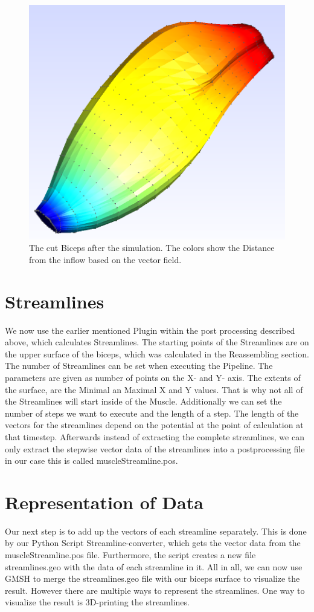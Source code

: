 \documentclass[preprint,journal]{vgtc}       %
\begin{document}
\begin{figure}
	\begin{center}
		\includegraphics[width=.7\linewidth]{Sim.png}
	\end{center}
	\caption{The cut Biceps after the simulation. The colors show the Distance from the inflow based on the vector field.}
	\label{fig:sim}
\end{figure}

\section{Streamlines}
We now use the earlier mentioned Plugin within the post processing described above, which calculates Streamlines. 
The starting points of the Streamlines are on the upper surface of the biceps, which was calculated in the Reassembling section. 
The number of Streamlines can be set when executing the Pipeline.
The parameters are given as number of points on the X- and Y- axis. 
The extents of the surface, are the Minimal an Maximal X and Y values. 
That is why not all of the Streamlines will start inside of the Muscle. 
Additionally we can set the number of steps we want to execute  and the length of a step.
The length of the vectors for the streamlines depend on the potential at the point of calculation at that timestep.
Afterwards instead of extracting the complete streamlines, we can only extract the stepwise vector data of the streamlines into a postprocessing file in our case this is called muscleStreamline.pos. %

\section{Representation of Data}
Our next step is to add up the vectors of each streamline separately. 
This is done by our Python Script Streamline-converter, which gets the vector data from the muscleStreamline.pos file. 
Furthermore, the script creates a new file streamlines.geo with the data of each streamline in it. 
All in all, we can now use GMSH to merge the streamlines.geo file with our biceps surface to visualize the result. 
However there are multiple ways to represent the streamlines. 
One way to visualize the result is 3D-printing the streamlines.
\end{document}
